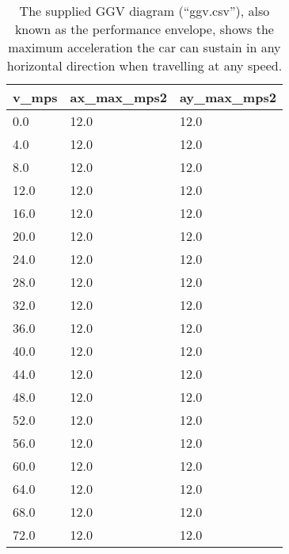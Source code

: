 \begin{table}[H]
    \centering
    \begin{tabular}{|l|l|l|}
        \hline
        \textbf{v\_mps} & \textbf{ax\_max\_mps2} & \textbf{ay\_max\_mps2} \\ \hline
        0.0             & 12.0                   & 12.0                   \\ \hline
        4.0             & 12.0                   & 12.0                   \\ \hline
        8.0             & 12.0                   & 12.0                   \\ \hline
        12.0            & 12.0                   & 12.0                   \\ \hline
        16.0            & 12.0                   & 12.0                   \\ \hline
        20.0            & 12.0                   & 12.0                   \\ \hline
        24.0            & 12.0                   & 12.0                   \\ \hline
        28.0            & 12.0                   & 12.0                   \\ \hline
        32.0            & 12.0                   & 12.0                   \\ \hline
        36.0            & 12.0                   & 12.0                   \\ \hline
        40.0            & 12.0                   & 12.0                   \\ \hline
        44.0            & 12.0                   & 12.0                   \\ \hline
        48.0            & 12.0                   & 12.0                   \\ \hline
        52.0            & 12.0                   & 12.0                   \\ \hline
        56.0            & 12.0                   & 12.0                   \\ \hline
        60.0            & 12.0                   & 12.0                   \\ \hline
        64.0            & 12.0                   & 12.0                   \\ \hline
        68.0            & 12.0                   & 12.0                   \\ \hline
        72.0            & 12.0                   & 12.0                   \\ \hline
    \end{tabular}
    \caption{The supplied GGV diagram (``ggv.csv''), also known as the performance envelope, shows the maximum acceleration the car can sustain in any horizontal direction when travelling at any speed.}
    \label{tab:GGV Diagram}
\end{table}

